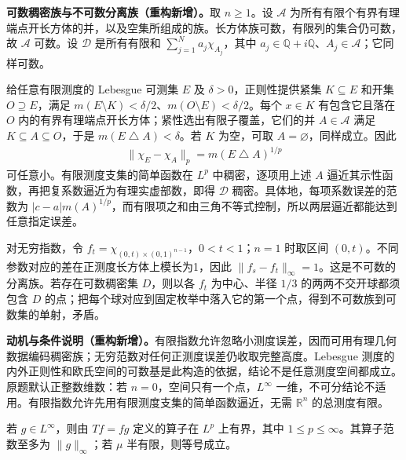 \documentclass[../../main.tex]{subfiles}
\begin{document}
\begin{solution}
\textbf{可数稠密族与不可数分离族（重构新增）。}取 $n\geqslant1$。设 $\mathcal A$ 为所有有限个有界有理端点开长方体的并，以及空集所组成的族。长方体族可数，有限列的集合仍可数，故 $\mathcal A$ 可数。设 $\mathcal D$ 是所有有限和 $\sum_{j=1}^Na_j\chi_{A_j}$，其中 $a_j\in\mathbb Q+i\mathbb Q$、$A_j\in\mathcal A$；它同样可数。

给任意有限测度的 Lebesgue 可测集 $E$ 及 $\delta>0$，正则性提供紧集 $K\subseteq E$ 和开集 $O\supseteq E$，满足 $m(E\setminus K)<\delta/2$、$m(O\setminus E)<\delta/2$。每个 $x\in K$ 有包含它且落在 $O$ 内的有界有理端点开长方体；紧性选出有限子覆盖，它们的并 $A\in\mathcal A$ 满足 $K\subseteq A\subseteq O$，于是 $m(E\mathbin{\triangle}A)<\delta$。若 $K$ 为空，可取 $A=\varnothing$，同样成立。因此
\begin{align*}
\|\chi_E-\chi_A\|_p=m(E\mathbin{\triangle}A)^{1/p}
\end{align*}
可任意小。有限测度支集的简单函数在 $L^p$ 中稠密，逐项用上述 $A$ 逼近其示性函数，再把复系数逼近为有理实虚部数，即得 $\mathcal D$ 稠密。具体地，每项系数误差的范数为 $|c-a|m(A)^{1/p}$，而有限项之和由三角不等式控制，所以两层逼近都能达到任意指定误差。

对无穷指数，令 $f_t=\chi_{(0,t)\times(0,1)^{n-1}}$，$0<t<1$；$n=1$ 时取区间 $(0,t)$。不同参数对应的差在正测度长方体上模长为1，因此 $\|f_s-f_t\|_\infty=1$。这是不可数的分离族。若存在可数稠密集 $D$，则以各 $f_t$ 为中心、半径 $1/3$ 的两两不交开球都须包含 $D$ 的点；把每个球对应到固定枚举中落入它的第一个点，得到不可数族到可数集的单射，矛盾。
\end{solution}
\begin{remark}
\textbf{动机与条件说明（重构新增）。}有限指数允许忽略小测度误差，因而可用有理几何数据编码稠密族；无穷范数对任何正测度误差仍收取完整高度。Lebesgue 测度的内外正则性和欧氏空间的可数基是此构造的依据，结论不是任意测度空间都成立。原题默认正整数维数：若 $n=0$，空间只有一个点，$L^\infty$ 一维，不可分结论不适用。有限指数允许先用有限测度支集的简单函数逼近，无需 $\mathbb R^n$ 的总测度有限。
\end{remark}
\begin{exercise}\label{exercise:ch06-multiplication-operator}
若 $g\in L^\infty$，则由 $Tf=fg$ 定义的算子在 $L^p$ 上有界，其中 $1\leqslant p\leqslant\infty$。其算子范数至多为 $\|g\|_\infty$；若 $\mu$ 半有限，则等号成立。
\end{exercise}
\end{document}
